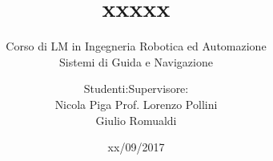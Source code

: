 \documentclass{beamer}
\date{xx/09/2017}
\title[]{xxxxx}
\subtitle{Corso di LM in Ingegneria Robotica ed Automazione \\
  Sistemi di Guida e Navigazione}
\author{Studenti:\hfill Supervisore:\\
Nicola Piga \hfill Prof. Lorenzo Pollini\\
Giulio Romualdi}
\institute[]{Università di Pisa}
\begin{document}

\begin{frame}
  \maketitle
\end{frame}


\end{document}

